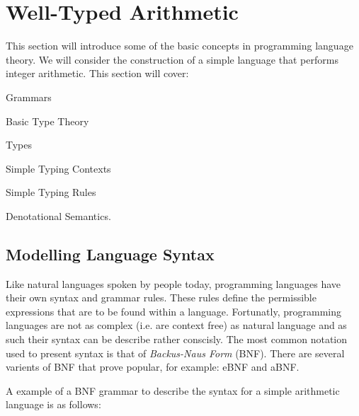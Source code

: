 \section{Well-Typed Arithmetic}
\label{sec:typed-arith}

\noindent
This section will introduce some of the basic concepts in programming language theory.
We will consider the construction of a simple language that performs integer arithmetic.
This section will cover:

\begin{compactitem}
\item Grammars
\item Basic Type Theory
  \begin{compactitem}
  \item Types
  \item Simple Typing Contexts
  \item Simple Typing Rules
  \end{compactitem}
\item Denotational Semantics.
\end{compactitem}

\subsection{Modelling Language Syntax}
\label{sec:typed-arith:syntax}

Like natural languages spoken by people today, programming languages have their own syntax and grammar rules.
These rules define the permissible expressions that are to be found within a language.
Fortunatly, programming languages are not as complex (i.e. are context free) as natural language and as such their syntax can be describe rather conscisly.
The most common notation used to present syntax is that of \emph{Backus-Naus Form} (BNF).
There are several varients of BNF that prove popular, for example: eBNF and aBNF.

A example of a BNF grammar to describe the syntax for a simple arithmetic language is as follows:

\begin{bnf}
\\
\\
\\
\\
\\
\\
\end{bnf}

